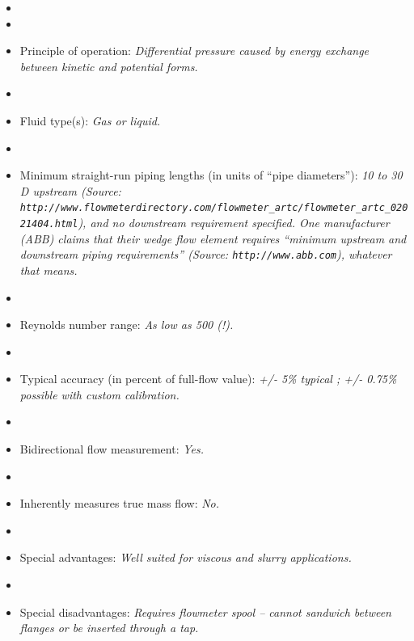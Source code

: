 \documentclass[12pt,a4paper]{article}
\begin{document}
\begin{itemize}
\goodbreak
\item{} 
\vskip 5pt
\item\item{} Principle of operation: {\it Differential pressure caused by energy exchange between kinetic and potential forms.}
\vskip 5pt
\item\item{} Fluid type(s): {\it Gas or liquid.}
\vskip 5pt
\item\item{} Minimum straight-run piping lengths (in units of ``pipe diameters''): {\it 10 to 30 D upstream (Source: {\tt http://www.flowmeterdirectory.com/flowmeter\_artc/flowmeter\_artc\_02021404.html}), and no downstream requirement specified.  One manufacturer (ABB) claims that their wedge flow element requires ``minimum upstream and downstream piping requirements'' (Source: {\tt http://www.abb.com}), whatever that means.}
\vskip 5pt
\item\item{} Reynolds number range: {\it As low as 500 (!).}
\vskip 5pt
\item\item{} Typical accuracy (in percent of full-flow value): {\it +/- 5\% typical ; +/- 0.75\% possible with custom calibration.}
\vskip 5pt
\item\item{} Bidirectional flow measurement: {\it Yes.}
\vskip 5pt
\item\item{} Inherently measures true mass flow: {\it No.}
\vskip 5pt
\item\item{} Special advantages: {\it Well suited for viscous and slurry applications.}
\vskip 5pt
\item\item{} Special disadvantages: {\it Requires flowmeter spool -- cannot sandwich between flanges or be inserted through a tap.}
\end{itemize}
\end{document}
